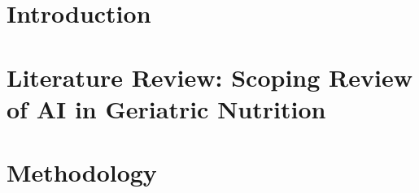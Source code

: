 \documentclass[12pt, a4paper, openany]{report}
\begin{document}
\begin{abstract}
    Together, the two phases demonstrate that the depth of conversational inquiry can be calibrated to the clinical stakes of each meal entry---asking more when the data demand it, and asking nothing when they do not.

    \bigskip
    \noindent\textbf{Keywords:} Agentic AI, Dietary Assessment, Geriatric Nutrition, Design Science Research, Scoping Review, Multimodal Interaction, Human-Computer Interaction

\end{abstract}

\tableofcontents
\listoffigures
\listoftables

\clearpage
{}
\chapter{Introduction}
\label{ch:introduction}


\chapter{Literature Review: Scoping Review of AI in Geriatric Nutrition}
\label{ch:literature}


\chapter{Methodology}
\label{ch:methodology}

\end{document}
